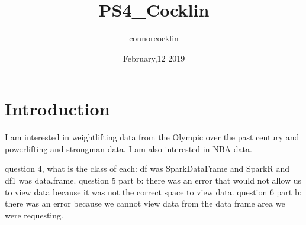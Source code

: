 \documentclass{article}
\title{PS4_Cocklin}
\author{connorcocklin }
\date{February,12 2019}
\begin{document}
\maketitle

\section{Introduction}
I am interested in weightlifting data from the Olympic over the past century and powerlifting and strongman data. I am also interested in NBA data. 

question 4, what is the class of each: df was SparkDataFrame and SparkR and df1 was data.frame.
question 5 part b: there was an error that would not allow us to view data because it was not the correct space to view data.
question 6 part b: there was an error because we cannot view data from the data frame area we were requesting.
\end{document}
